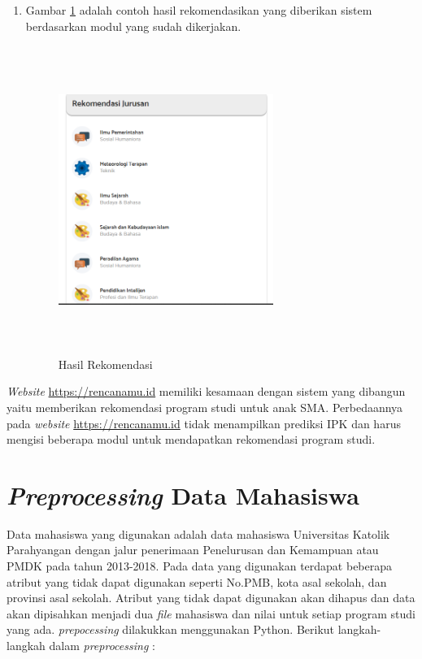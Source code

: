 \begin{enumerate}
    \item Gambar \ref{gambar36} adalah contoh hasil rekomendasikan yang diberikan sistem berdasarkan modul yang sudah dikerjakan.
    
    \begin{figure}[H]
        \centering
        \includegraphics[width = 7cm, height = 10cm ]{doc/DokumenSkripsi/Gambar/gambar36.PNG}
        \caption{Hasil Rekomendasi}
        \label{gambar36}
    \end{figure}
    
\end{enumerate}

\textit{Website} \url{https://rencanamu.id} memiliki kesamaan dengan sistem yang dibangun yaitu memberikan rekomendasi program studi untuk anak SMA. Perbedaannya pada \textit{website} \url{https://rencanamu.id} tidak menampilkan prediksi IPK dan harus mengisi beberapa modul untuk mendapatkan rekomendasi program studi. 

\section{\textit{Preprocessing} Data Mahasiswa}
\label{sec:preprocessing}
Data mahasiswa yang digunakan adalah data mahasiswa Universitas Katolik Parahyangan dengan jalur penerimaan Penelurusan dan Kemampuan atau PMDK pada tahun 2013-2018. Pada data yang digunakan terdapat beberapa atribut yang tidak dapat digunakan seperti No.PMB,  kota asal sekolah, dan provinsi asal sekolah. Atribut yang tidak dapat digunakan akan dihapus dan data akan dipisahkan menjadi dua \textit{file} mahasiswa dan nilai untuk setiap program studi yang ada. \textit{prepocessing} dilakukkan menggunakan Python. Berikut langkah-langkah dalam \textit{preprocessing} :

